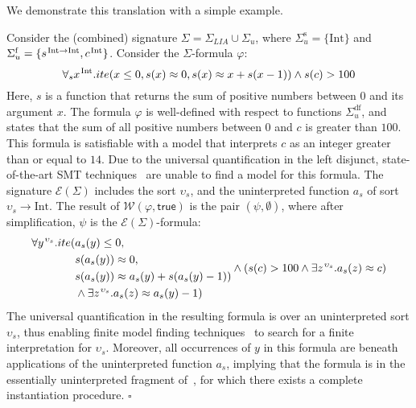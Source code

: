 \documentclass[runningheads,a4paper]{llncs}
\newcommand{\con}[1]{\mathsf{#1}}
\newcommand{\teq}{\approx}
\newcommand{\conv}{\mathcal{W}}
\newcommand{\ssorts}[1]{#1^\mathrm{s}}
\newcommand{\sfuns}[1]{#1^\mathrm{f}}
\newcommand{\sfundefs}[1]{#1^\mathrm{df}}
\newcommand{\sortint}{\mathrm{Int}}
\newcommand{\ptrue}{\con{true}}
\newcommand{\farg}[1]{a_{#1}}
\newcommand{\fargsort}[1]{\upsilon_{#1}}
\newcommand{\Sigmalia}{\Sigma_{LIA}}
\newcommand{\extendsig}[1]{\mathcal{E}( #1 )}
\newcommand{\vthinspace}{\kern+0.083333em}
\newcommand{\typ}[1]{^{\vthinspace #1}}
\begin{document}
We demonstrate this translation with a simple example.

\begin{example}
Consider the (combined) signature $\Sigma = \Sigmalia \cup \Sigma_u$,
where $\ssorts{\Sigma_u} = \{ \sortint \}$ and 
$\sfuns{\Sigma_u} = \{ s\typ{ \sortint \rightarrow \sortint }, c\typ{ \sortint } \}$.
Consider the $\Sigma$-formula $\varphi$:
\begin{equation*}
\forall_{s} x\typ{\sortint}. ite( x \leq 0, s(x) \teq 0, s( x ) \teq x + s( x-1 ) ) \wedge s( c ) > 100
\end{equation*}
Here, $s$ is a function that returns the sum of positive numbers between $0$ and its argument $x$.
The formula $\varphi$ is well-defined with respect to functions $\sfundefs{\Sigma_u}$,
and states that the sum of all positive numbers between $0$ and $c$ is greater than $100$.
This formula is satisfiable with a model that interprets $c$ as an integer greater than or equal to $14$.
Due to the universal quantification in the left disjunct,
state-of-the-art SMT techniques~\cite{GeDeM-CAV-09, ReyEtAl-1-RR-13} are unable to find a model for this formula.
The signature $\extendsig{\Sigma}$ includes the sort $\fargsort{s}$,
and the uninterpreted function $\farg{s}$ of sort $\fargsort{s} \rightarrow \sortint$.
The result of $\conv( \varphi, \ptrue )$ is the pair $( \psi, \emptyset )$, where after simplification, $\psi$ is the $\extendsig{\Sigma}$-formula:
\begin{equation*}
\begin{split}
\forall y\typ{\fargsort{s}}. ite( & \farg{s}( y ) \leq 0,  \\
 & s(\farg{s}( y )) \teq 0, \\
 & s(\farg{s}( y )) \teq \farg{s}( y ) + s( \farg{s}( y )-1 ) ) \\
 & \wedge \exists z\typ{\fargsort{s}}. \farg{s}( z ) \teq \farg{s}( y )-1 )
\end{split}  
\wedge ( s( c ) > 100 \wedge \exists z\typ{\fargsort{s}}. \farg{s}( z ) \teq c )
\end{equation*}
The universal quantification in the resulting formula is over an uninterpreted sort $\fargsort{s}$, 
thus enabling finite model finding techniques~\cite{ReyEtAl-1-RR-13} to search for a finite interpretation for $\fargsort{s}$.
Moreover, all occurrences of $y$ in this formula are beneath applications of the uninterpreted function $\farg{s}$,
implying that the formula is in the essentially uninterpreted fragment of~\cite{GeDeM-CAV-09}, for which there exists a complete instantiation procedure.
$\square$
\end{example}
\end{document}
